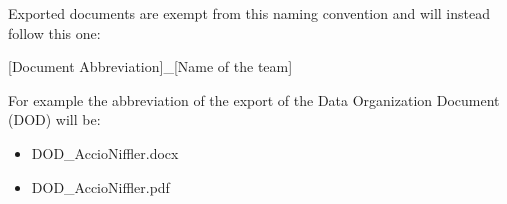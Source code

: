 Exported documents are exempt from this naming convention and will instead follow this one:

[Document Abbreviation]\_[Name of the team]

For example the abbreviation of the export of the Data Organization Document (DOD) will be:

\begin{itemize}
			\item DOD\_AccioNiffler.docx
			\item DOD\_AccioNiffler.pdf
\end{itemize}

\pagebreak